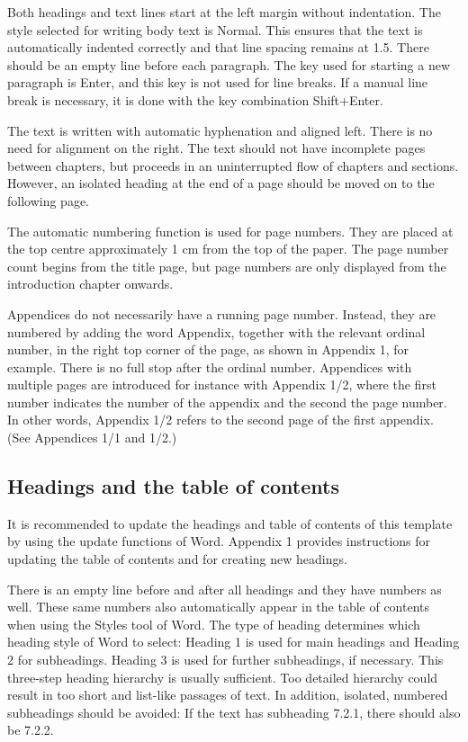 \documentclass[12pt]{article}
\begin{document}
Both headings and text lines start at the left margin without indentation. The style selected for writing body text is Normal. This ensures that the text is automatically indented correctly and that line spacing remains at 1.5. There should be an empty line before each paragraph. The key used for starting a new paragraph is Enter, and this key is not used for line breaks. If a manual line break is necessary, it is done with the key combination Shift+Enter.

The text is written with automatic hyphenation and aligned left. There is no need for alignment on the right. The text should not have incomplete pages between chapters, but proceeds in an uninterrupted flow of chapters and sections. However, an isolated heading at the end of a page should be moved on to the following page.

The automatic numbering function is used for page numbers. They are placed at the top centre approximately 1 cm from the top of the paper. The page number count begins from the title page, but page numbers are only displayed from the introduction chapter onwards.

Appendices do not necessarily have a running page number. Instead, they are numbered by adding the word Appendix, together with the relevant ordinal number, in the right top corner of the page, as shown in Appendix 1, for example. There is no full stop after the ordinal number. Appendices with multiple pages are introduced for instance with Appendix 1/2, where the first number indicates the number of the appendix and the second the page number. In other words, Appendix 1/2 refers to the second page of the first appendix. (See Appendices 1/1 and 1/2.)

\subsection{Headings and the table of contents}
It is recommended to update the headings and table of contents of this template by using the update functions of Word. Appendix 1 provides instructions for updating the table of contents and for creating new headings.

There is an empty line before and after all headings and they have numbers as well. These same numbers also automatically appear in the table of contents when using the Styles tool of Word. The type of heading determines which heading style of Word to select: Heading 1 is used for main headings and Heading 2 for subheadings. Heading 3 is used for further subheadings, if necessary. This three-step heading hierarchy is usually sufficient. Too detailed hierarchy could result in too short and list-like passages of text. In addition, isolated, numbered subheadings should be avoided: If the text has subheading 7.2.1, there should also be 7.2.2.
\end{document}
